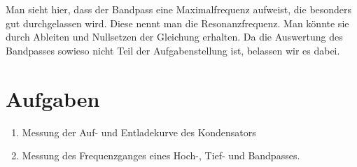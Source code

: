 \documentclass[a4paper,german,12pt,smallheadings]{scrartcl}
\begin{document}
Man sieht hier, dass der Bandpass eine Maximalfrequenz aufweist, die besonders
gut durchgelassen wird. Diese nennt man die Resonanzfrequenz. Man könnte sie
durch Ableiten und Nullsetzen der Gleichung erhalten. Da die Auswertung des
Bandpasses sowieso nicht Teil der Aufgabenstellung ist, belassen wir es dabei.

\section{Aufgaben}

\begin{enumerate}
  \item Messung der Auf- und Entladekurve des Kondensators
  \item Messung des Frequenzganges eines Hoch-, Tief- und Bandpasses.
\end{enumerate}
\end{document}
